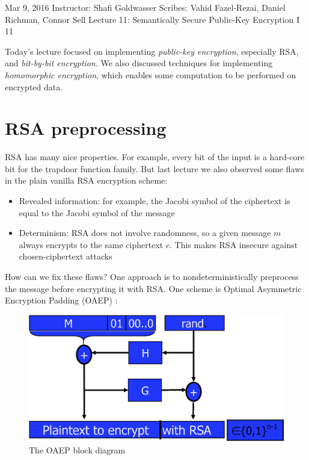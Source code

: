 \documentclass[10pt]{article}
\newcommand{\scribes}{Vahid Fazel-Rezai, Daniel Richman, Connor Sell}
\newcommand{\lecnumber}{11}
\newcommand{\lectitle}{Semantically Secure Public-Key Encryption I
}
\newcommand{\thedate}{Mar 9, 2016}
\begin{document}


{\thedate}
{Instructor: Shafi Goldwasser}
{Scribes: \scribes}
{Lecture \lecnumber: \lectitle}
{\lecnumber}


Today's lecture focused on implementing \textit{public-key encryption}, especially RSA, and \textit{bit-by-bit encryption}. We also discussed techniques for implementing \textit{homomorphic encryption}, which enables some computation to be performed on encrypted data. 

\section{RSA preprocessing}

RSA has many nice properties. For example, every bit of the input is a hard-core bit for the trapdoor function family. But last lecture we also observed some flaws in the plain vanilla RSA encryption scheme:
\begin{itemize}
  \item Revealed information: for example, the Jacobi symbol of the ciphertext is equal to the Jacobi symbol of the message
  \item Determinism: RSA does not involve randomness, so a given message $m$ always encrypts to the same ciphertext $c$. This makes RSA insecure against chosen-ciphertext attacks
\end{itemize}

How can we fix these flaws? One approach is to nondeterministically preprocess the message before encrypting it with RSA. One scheme is Optimal Asymmetric Encryption Padding (OAEP) \cite{BRDS}:

\begin{figure}['h']
\includegraphics{oaep}
\caption{The OAEP block diagram}
\end{figure}
\end{document}
